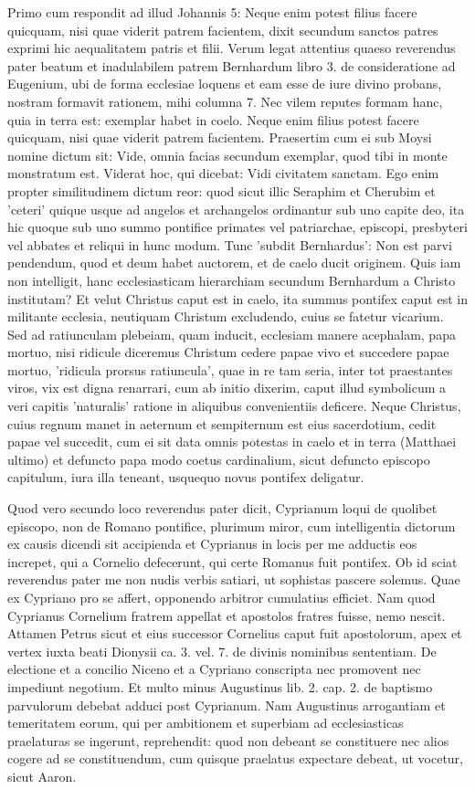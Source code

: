 Primo cum respondit ad illud Johannis 5: Neque enim potest filius facere quicquam, nisi quae viderit patrem facientem, dixit secundum sanctos patres exprimi hic aequalitatem patris et filii. Verum legat attentius quaeso reverendus pater beatum et inadulabilem patrem Bernhardum libro 3. de consideratione ad Eugenium, ubi de forma ecclesiae loquens et eam esse de iure divino probans, nostram formavit rationem, mihi columna 7. Nec vilem reputes formam hanc, quia in terra est: exemplar habet in coelo. Neque enim filius potest facere quicquam, nisi quae viderit patrem facientem. Praesertim cum ei sub Moysi nomine dictum sit: Vide, omnia facias secundum exemplar, quod tibi in monte monstratum est. Viderat hoc, qui dicebat: Vidi civitatem sanctam. Ego enim propter similitudinem dictum reor: quod sicut illic Seraphim et Cherubim et 'ceteri' quique usque ad angelos et archangelos ordinantur sub uno capite deo, ita hic quoque sub uno summo pontifice primates vel patriarchae, episcopi, presbyteri vel abbates et reliqui in hunc modum. Tunc 'subdit Bernhardus': Non est parvi pendendum, quod et deum habet auctorem, et de caelo ducit originem. Quis iam non intelligit, hanc ecclesiasticam hierarchiam secundum Bernhardum a Christo institutam? Et velut Christus caput est in caelo, ita summus pontifex caput est in militante ecclesia, neutiquam Christum excludendo, cuius se fatetur vicarium. Sed ad ratiunculam plebeiam, quam inducit, ecclesiam manere acephalam, \marginpar{\small[261]} papa mortuo, nisi ridicule diceremus Christum cedere papae vivo et succedere papae mortuo, 'ridicula prorsus ratiuncula', quae in re tam seria, inter tot praestantes viros, vix est digna renarrari, cum ab initio dixerim, caput illud symbolicum a veri capitis 'naturalis' ratione in aliquibus convenientiis deficere. Neque Christus, cuius regnum manet in aeternum et sempiternum est eius sacerdotium, cedit papae vel succedit, cum ei sit data omnis potestas in caelo et in terra (Matthaei ultimo) et defuncto papa modo coetus cardinalium, sicut defuncto episcopo capitulum, iura illa teneant, usquequo novus pontifex deligatur.

Quod vero secundo loco reverendus pater dicit, Cyprianum loqui de quolibet episcopo, non de Romano pontifice, plurimum miror, cum intelligentia dictorum ex causis dicendi sit accipienda et Cyprianus in locis per me adductis eos increpet, qui a Cornelio defecerunt, qui certe Romanus fuit pontifex. Ob id sciat reverendus pater me non nudis verbis satiari, ut sophistas pascere solemus. Quae ex Cypriano pro se affert, opponendo arbitror cumulatius efficiet. Nam quod Cyprianus Cornelium fratrem appellat et apostolos fratres fuisse, nemo nescit. Attamen Petrus sicut et eius successor Cornelius caput fuit apostolorum, apex et vertex iuxta beati Dionysii ca. 3. vel. 7. de divinis nominibus sententiam. De electione et a concilio Niceno et a Cypriano conscripta nec promovent nec impediunt negotium. Et multo minus Augustinus lib. 2. cap. 2. de baptismo parvulorum debebat adduci post Cyprianum. Nam Augustinus arrogantiam et temeritatem eorum, qui per ambitionem et superbiam ad ecclesiasticas praelaturas se ingerunt, reprehendit: quod non debeant se constituere nec alios cogere ad se constituendum, cum quisque praelatus expectare debeat, ut vocetur, sicut Aaron.

